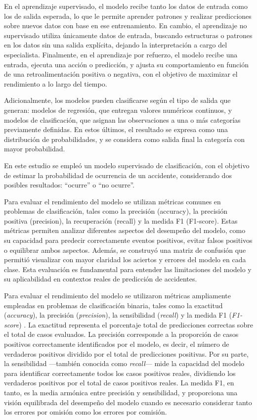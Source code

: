 \documentclass[12pt]{article}
\begin{document}
En el aprendizaje supervisado, el modelo recibe tanto los datos de entrada como los de salida esperada, lo que le permite aprender patrones y realizar predicciones sobre nuevos datos con base en ese entrenamiento. En cambio, el aprendizaje no supervisado utiliza únicamente datos de entrada, buscando estructuras o patrones en los datos sin una salida explícita, dejando la interpretación a cargo del especialista. Finalmente, en el aprendizaje por refuerzo, el modelo recibe una entrada, ejecuta una acción o predicción, y ajusta su comportamiento en función de una retroalimentación positiva o negativa, con el objetivo de maximizar el rendimiento a lo largo del tiempo.

Adicionalmente, los modelos pueden clasificarse según el tipo de salida que generan: modelos de regresión, que entregan valores numéricos continuos, y modelos de clasificación, que asignan las observaciones a una o más categorías previamente definidas. En estos últimos, el resultado se expresa como una distribución de probabilidades, y se considera como salida final la categoría con mayor probabilidad.

En este estudio se empleó un modelo supervisado de clasificación, con el objetivo de estimar la probabilidad de ocurrencia de un accidente, considerando dos posibles resultados: “ocurre” o “no ocurre”.

Para evaluar el rendimiento del modelo se utilizan métricas comunes en problemas de clasificación, tales como la precisión (accuracy), la precisión positiva (precision), la recuperación (recall) y la medida F1 (F1-score). Estas métricas permiten analizar diferentes aspectos del desempeño del modelo, como su capacidad para predecir correctamente eventos positivos, evitar falsos positivos o equilibrar ambos aspectos. Además, se construyó una matriz de confusión que permitió visualizar con mayor claridad los aciertos y errores del modelo en cada clase. Esta evaluación es fundamental para entender las limitaciones del modelo y su aplicabilidad en contextos reales de predicción de accidentes.

Para evaluar el rendimiento del modelo se utilizaron métricas ampliamente empleadas en problemas de clasificación binaria, tales como la exactitud (\textit{accuracy}), la precisión (\textit{precision}), la sensibilidad (\textit{recall}) y la medida F1 (\textit{F1-score}) \citep{manning2008}. La exactitud representa el porcentaje total de predicciones correctas sobre el total de casos evaluados. La precisión corresponde a la proporción de casos positivos correctamente identificados por el modelo, es decir, el número de verdaderos positivos dividido por el total de predicciones positivas. Por su parte, la sensibilidad —también conocida como \textit{recall}— mide la capacidad del modelo para identificar correctamente todos los casos positivos reales, dividiendo los verdaderos positivos por el total de casos positivos reales. La medida F1, en tanto, es la media armónica entre precisión y sensibilidad, y proporciona una visión equilibrada del desempeño del modelo cuando es necesario considerar tanto los errores por omisión como los errores por comisión.
\end{document}
